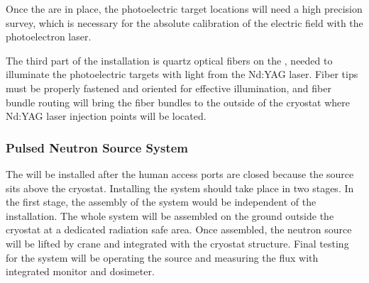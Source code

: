 Once the  are in place, the photoelectric target locations will need a high precision survey, which is necessary for the absolute calibration of the electric field with the photoelectron laser. 

The third part of the installation is  quartz optical fibers on the , needed to illuminate  the photoelectric targets with light from the Nd:YAG laser. 
Fiber tips must be properly fastened and oriented for effective illumination, and fiber bundle routing will bring the fiber bundles to the outside of the cryostat where Nd:YAG laser injection points will be located. 

\subsubsection{Pulsed Neutron Source System} 
The  will be installed after the human access ports are closed because the source sits above the cryostat. Installing the system should take place in two stages. In the first stage, the assembly of the system would be independent of the  installation. The whole system will be %
assembled on the ground outside the cryostat at a dedicated radiation safe area. Once assembled, the neutron source will be lifted by crane and integrated with the cryostat structure. Final  testing for the system will be operating the source and measuring the flux with integrated monitor and dosimeter.



